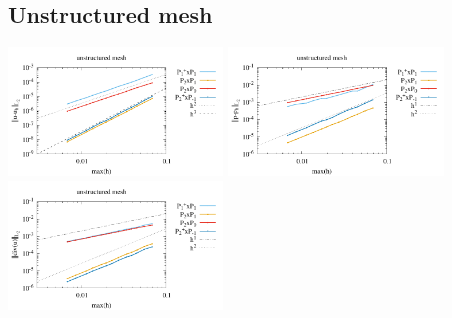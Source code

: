 \subsection*{Unstructured mesh}

\begin{center}
\includegraphics[width=5.7cm]{python_codes/fieldstone_120/paperresults/dh_unstructured_errorsV.pdf}
\includegraphics[width=5.7cm]{python_codes/fieldstone_120/paperresults/dh_unstructured_errorsP.pdf}
\includegraphics[width=5.7cm]{python_codes/fieldstone_120/paperresults/dh_unstructured_errors_divv.pdf}\\
\end{center}

